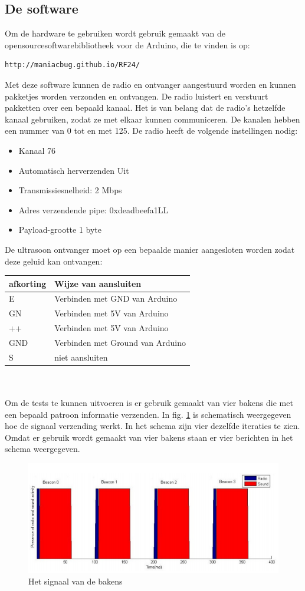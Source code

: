 \documentclass{article}
\begin{document}
\subsection{De software}
Om de hardware te gebruiken wordt gebruik gemaakt van de opensourcesoftwarebibliotheek voor de Arduino, die te vinden is op: \begin{verbatim}http://maniacbug.github.io/RF24/ \end{verbatim} 
Met deze software kunnen de radio en ontvanger aangestuurd worden en kunnen pakketjes worden verzonden en ontvangen. De radio luistert en verstuurt pakketten over een bepaald kanaal. Het is van belang dat de radio's hetzelfde kanaal gebruiken, zodat ze met elkaar kunnen communiceren. De kanalen hebben een nummer van 0 tot en met 125. De radio heeft de volgende instellingen nodig:
\begin{itemize}
	\item Kanaal 76 
	\item Automatisch herverzenden Uit
	\item Transmissiesnelheid: 2 Mbps
	\item Adres verzendende pipe: 0xdeadbeefa1LL
	\item Payload-grootte 1 byte
\end{itemize}
De ultrasoon ontvanger moet op een bepaalde manier aangesloten worden zodat deze geluid kan ontvangen:
\newline
\begin{tabular}{l| l}
\hline
afkorting & Wijze van aansluiten \\ \hline
E & Verbinden met GND van Arduino \\
GN & Verbinden met 5V van Arduino \\
++ & Verbinden met 5V van Arduino \\
GND & Verbinden met Ground van Arduino \\
S & niet aansluiten \\
\end{tabular}
\\
\\
Om de tests te kunnen uitvoeren is er gebruik gemaakt van vier bakens die met een bepaald patroon informatie verzenden. In fig.  \ref{uitzenden_bakens} is schematisch weergegeven hoe de signaal verzending werkt. In het schema zijn vier dezelfde iteraties te zien. Omdat er gebruik wordt gemaakt van vier bakens staan er vier berichten in het schema weergegeven. 
\begin{figure}[h]
\centering\includegraphics[]{berichten_bakens.png}
\caption{Het signaal van de bakens}
\label{uitzenden_bakens}
\end{figure}
\end{document}
